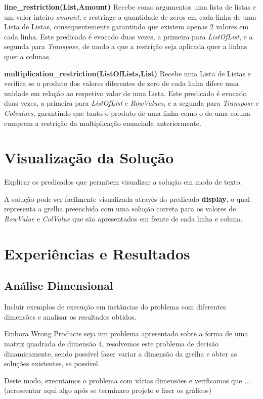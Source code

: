 \documentclass[11pt]{article}
\begin{document}
\bigskip

\textbf{line\_restriction(List,Amount)} Recebe como argumentos uma lista de listas e um valor inteiro \emph{amount}, e restringe a quantidade de zeros em cada linha de uma Lista de Listas, consequentemente garantindo que existem apenas 2 valores em cada linha. Este predicado é evocado duas vezes, a primeira para \emph{ListOfList}, e a segunda para \emph{Transpose}, de modo a que a restrição seja aplicada quer a linhas quer a colunas.

\bigskip

\textbf{multiplication\_restriction(ListOfLists,List)} Recebe uma Lista de Listas e verifica se o produto dos valores diferentes de zero de cada linha difere uma unidade em relação ao respetivo valor de uma Lista. Este predicado é evocado duas vezes, a primeira para \emph{ListOfList} e \emph{RowValues}, e a segunda para \emph{Transpose} e \emph{Colvalues}, garantindo que tanto o produto de uma linha como o de uma coluna cumprem a restrição da multiplicação enunciada anteriormente.


\section{Visualização da Solução} Explicar os predicados que permitem
visualizar a solução em modo de texto.

A solução pode ser facilmente visualizada através do predicado \textbf{display}, o qual representa a grelha preenchida com uma solução correta para os valores de \emph{RowValue} e \emph{ColValue} que são apresentados em frente de cada linha e coluna.


\section{Experiências e Resultados}

\subsection{Análise Dimensional} Incluir exemplos de execução em instâncias do problema com
diferentes dimensões e analisar os resultados obtidos.

Embora Wrong Products seja um problema apresentado sobre a forma de uma matriz quadrada de dimensão 4, resolvemos este problema de decisão dinamicamente, sendo possível fazer variar a dimensão da grelha e obter as soluções existentes, se possível.

Deste modo, executamos o problema com várias dimensões e verificamos que ...(acrescentar aqui algo após se terminaro projeto e fizer os gráficos)
\end{document}
